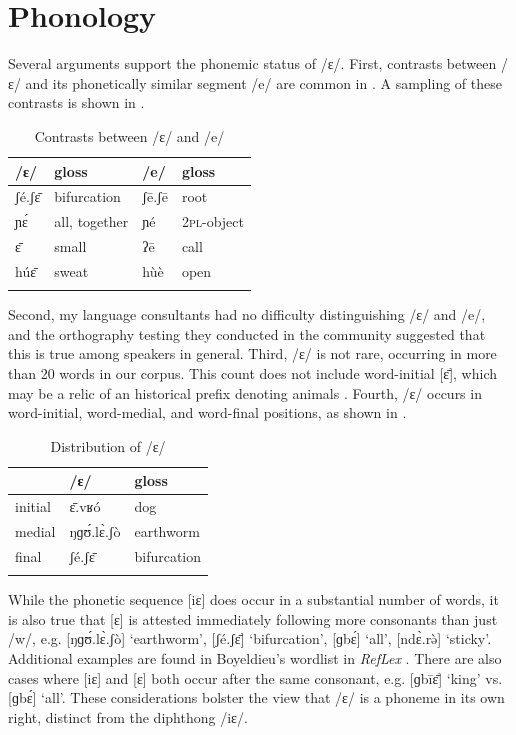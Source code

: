 \documentclass[output=paper,colorlinks,citecolor=brown]{langscibook}
\begin{document}
\section{Phonology}\label{sec:olson:2}

Several arguments support the phonemic status of /ɛ/. First, contrasts between /ɛ/ and its phonetically similar segment /e/ are common in . A sampling of these contrasts is shown in .

\begin{table}
\caption{Contrasts between /ɛ/ and /e/}
\label{tab:olson:4}
    \begin{tabular}{l l l l}
    \lsptoprule
        /ɛ/ & gloss & /e/  & gloss\\
    \midrule
        ʃé.ʃɛ̄ & bifurcation & ʃē.ʃē & root\\
        ɲɛ́  & all, together  & ɲé    & \textsc{2pl}-object\\
        ɛ̄     & small       & ʔē    & call\\
        húɛ̄   & sweat       & hùè   & open\\
    \lspbottomrule
    \end{tabular}
\end{table}

Second, my language consultants had no difficulty distinguishing /ɛ/ and /e/, and the orthography testing they conducted in the  community suggested that this is true among  speakers in general. Third, /ɛ/ is not rare, occurring in more than 20 words in our corpus. This count does not include word-initial [ɛ̄], which may be a relic of an historical prefix denoting animals \citep[13]{Greenberg1970}. Fourth, /ɛ/ occurs in word-initial, word-medial, and word-final positions, as shown in .

\begin{table}
\caption{Distribution of /ɛ/}
\label{tab:olson:5}
    \begin{tabular}{lll}
    \lsptoprule
                    & /ɛ/ & gloss\\
    \midrule
        initial     & ɛ̄.vʁó & dog\\
        medial      & ŋɡʊ́.lɛ̀.ʃò  & earthworm\\
        final       & ʃé.ʃɛ̄   & bifurcation\\
    \lspbottomrule
 \end{tabular}
\end{table}

While the phonetic sequence [iɛ] does occur in a substantial number of words, it is also true that [ɛ] is attested immediately following more consonants than just /w/, e.g. [ŋɡʊ́.lɛ̀.ʃò] ‘earthworm’, [ʃé.ʃɛ̄] ‘bifurcation’, [ɡbɛ́] ‘all’, [ndɛ̀.rə̀] ‘sticky’. Additional examples are found in Boyeldieu's  wordlist in \textit{RefLex} \citep{SegererFlavier2011}. There are also cases where [iɛ] and [ɛ] both occur after the same consonant, e.g. [ɡbīɛ̄] ‘king’ vs. [ɡbɛ́] ‘all’. These considerations bolster the view that /ɛ/ is a phoneme in its own right, distinct from the diphthong /iɛ/.
\end{document}

